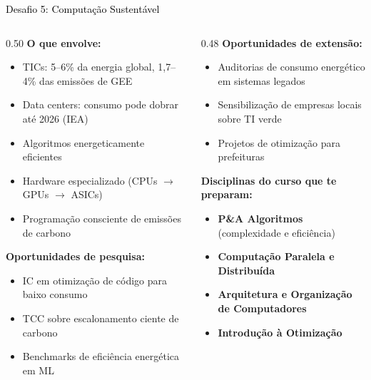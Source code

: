 \documentclass[aspectratio=169]{beamer}
\newcommand{\impt}[1]{\textcolor{morange}{\textbf{#1}}}
\newcommand{\ntc}[1]{\textcolor{mblue}{#1}}
\newcommand{\cc}[1]{\textcolor{mcc}{\textbf{#1}}}
\newcommand{\ia}[1]{\textcolor{mia}{\textbf{#1}}}
\begin{document}
\begin{frame}{\colorbox{dsfsus}{\textcolor{black}{Desafio 5: Computação Sustentável}}}
  \footnotesize
  \begin{columns}[T]
    \begin{column}{0.50\textwidth}
      \textbf{O que envolve:}
      \begin{itemize}\setlength\itemsep{3pt}
        \item TICs: 5--6\% da energia global, 1,7--4\% das emissões de GEE
        \item Data centers: consumo pode dobrar até 2026 (IEA)
        \item Algoritmos energeticamente eficientes
        \item Hardware especializado (CPUs $\to$ GPUs $\to$ ASICs)
        \item Programação consciente de emissões de carbono
      \end{itemize}
      \vspace{0.2cm}
      \textbf{Oportunidades de \impt{pesquisa}:}
      \begin{itemize}\setlength\itemsep{2pt}
        \item IC em otimização de código para baixo consumo
        \item TCC sobre escalonamento ciente de carbono
        \item Benchmarks de eficiência energética em ML
      \end{itemize}
    \end{column}
    \begin{column}{0.48\textwidth}
      \textbf{Oportunidades de \ntc{extensão}:}
      \begin{itemize}\setlength\itemsep{2pt}
        \item Auditorias de consumo energético em sistemas legados
        \item Sensibilização de empresas locais sobre TI verde
        \item Projetos de otimização para prefeituras
      \end{itemize}
      \vspace{0.2cm}
      \textbf{Disciplinas do curso que te preparam:}
      \begin{itemize}\setlength\itemsep{2pt}
        \item \cc{P\&A Algoritmos} (complexidade e eficiência)
        \item \ia{Computação Paralela e Distribuída}
        \item \cc{Arquitetura e Organização de Computadores}
        \item \ia{Introdução à Otimização}
      \end{itemize}
    \end{column}
  \end{columns}
\end{frame}
\end{document}
